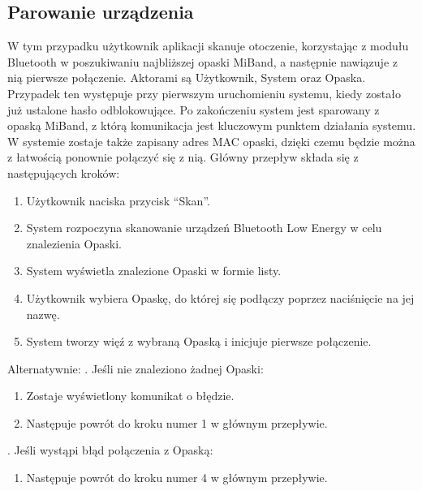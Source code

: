 \subsection{Parowanie urządzenia}
W tym przypadku użytkownik aplikacji skanuje otoczenie, korzystając z modułu Bluetooth w poszukiwaniu najbliższej opaski MiBand, a następnie nawiązuje z nią pierwsze połączenie. Aktorami są Użytkownik, System oraz Opaska. Przypadek ten występuje przy pierwszym uruchomieniu systemu, kiedy zostało już ustalone hasło odblokowujące. Po zakończeniu system jest sparowany z opaską MiBand, z którą komunikacja jest kluczowym punktem działania systemu. W systemie zostaje także zapisany adres MAC opaski, dzięki czemu będzie można z łatwością ponownie połączyć się z nią. Główny przepływ składa się z następujących kroków:
\begin{enumerate}
    \item Użytkownik naciska przycisk ``Skan''.
    \item System rozpoczyna skanowanie urządzeń Bluetooth Low Energy w celu znalezienia Opaski.
    \item System wyświetla znalezione Opaski w formie listy. 
    \item Użytkownik wybiera Opaskę, do której się podłączy poprzez naciśnięcie na jej nazwę.
    \item System tworzy więź z wybraną Opaską i inicjuje pierwsze połączenie.
\end{enumerate}
Alternatywnie:
\newline\newline
{}. Jeśli nie znaleziono żadnej Opaski:
\begin{enumerate}[leftmargin=3\parindent]
    \item Zostaje wyświetlony komunikat o błędzie.
    \item Następuje powrót do kroku numer 1 w głównym przepływie.
\end{enumerate}
\quad\newline
{}. Jeśli wystąpi błąd połączenia z Opaską:
\begin{enumerate}[leftmargin=3\parindent]
    \item Następuje powrót do kroku numer 4 w głównym przepływie.
\end{enumerate}

